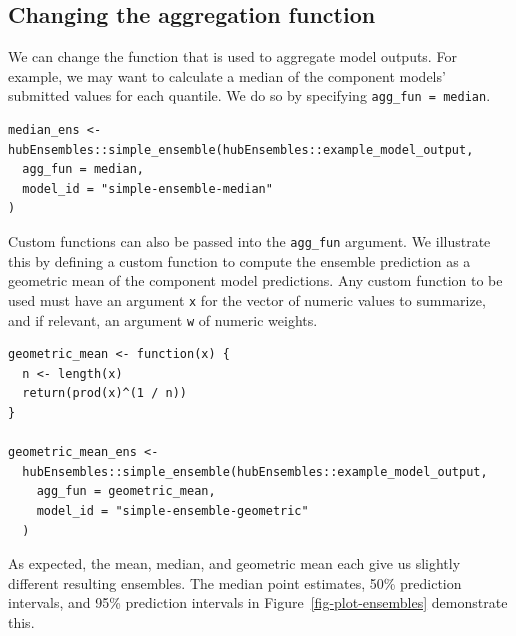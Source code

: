 \documentclass[
  article,
  shortnames,
  notitle]{jss}
\begin{document}
\begin{longtable}[]
\caption{\label{tbl-mean-ensemble}Mean ensemble model output. The values
in the model\_id column are determined by
\texttt{simple\_ensemble(...,\ model\_id\ =\ )} argument). A subset of
ensemble model output is shown: 1-week ahead pmf forecasts made on
2022-12-17 for the US. Results are generated for all output types. Here,
we show only the median, 50\% prediction intervals, and 95\% prediction
intervals for the quantile output type and all bins for the pmf output
type. The \texttt{location} and \texttt{target\_end\_date} columns have
been omitted for brevity, and the \texttt{value} column is rounded to
two digits.}

\tabularnewline
\end{longtable}

\subsection{Changing the aggregation
function}\label{changing-the-aggregation-function}

We can change the function that is used to aggregate model outputs. For
example, we may want to calculate a median of the component models'
submitted values for each quantile. We do so by specifying
\texttt{agg\_fun\ =\ median}.

\begin{verbatim}
median_ens <- hubEnsembles::simple_ensemble(hubEnsembles::example_model_output,
  agg_fun = median,
  model_id = "simple-ensemble-median"
)
\end{verbatim}

Custom functions can also be passed into the \texttt{agg\_fun} argument.
We illustrate this by defining a custom function to compute the ensemble
prediction as a geometric mean of the component model predictions. Any
custom function to be used must have an argument \texttt{x} for the
vector of numeric values to summarize, and if relevant, an argument
\texttt{w} of numeric weights.

\begin{verbatim}
geometric_mean <- function(x) {
  n <- length(x)
  return(prod(x)^(1 / n))
}

geometric_mean_ens <-
  hubEnsembles::simple_ensemble(hubEnsembles::example_model_output,
    agg_fun = geometric_mean,
    model_id = "simple-ensemble-geometric"
  )
\end{verbatim}

As expected, the mean, median, and geometric mean each give us slightly
different resulting ensembles. The median point estimates, 50\%
prediction intervals, and 95\% prediction intervals in
Figure~\ref{fig-plot-ensembles} demonstrate this.
\end{document}
